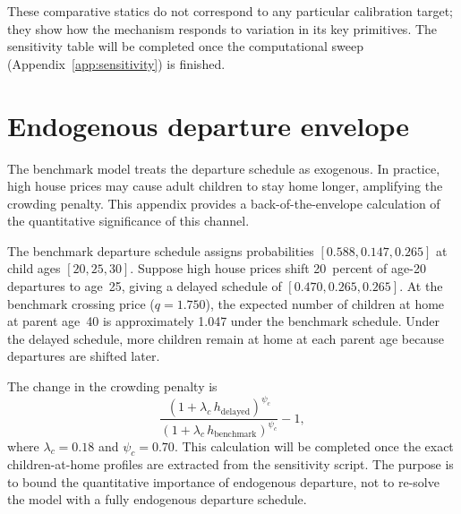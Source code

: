 \documentclass[11pt]{article}
\begin{document}
These comparative statics do not correspond to any particular calibration target; they show
how the mechanism responds to variation in its key primitives. The sensitivity table will be
completed once the computational sweep (Appendix~\ref{app:sensitivity}) is finished.

\section{Endogenous departure envelope}
\label{app:departure}

The benchmark model treats the departure schedule as exogenous. In practice, high house
prices may cause adult children to stay home longer, amplifying the crowding penalty. This
appendix provides a back-of-the-envelope calculation of the quantitative significance of
this channel.

The benchmark departure schedule assigns probabilities $[0.588, 0.147, 0.265]$ at child
ages $[20, 25, 30]$. Suppose high house prices shift 20~percent of age-20 departures to
age~25, giving a delayed schedule of $[0.470, 0.265, 0.265]$. At the benchmark crossing
price ($q = 1.750$), the expected number of children at home at parent age~40 is
approximately 1.047 under the benchmark schedule. Under the delayed schedule, more children
remain at home at each parent age because departures are shifted later.

The change in the crowding penalty is
\[
\frac{(1 + \lambda_c \, h_{\text{delayed}})^{\psi_c}}{(1 + \lambda_c \, h_{\text{benchmark}})^{\psi_c}} - 1,
\]
where $\lambda_c = 0.18$ and $\psi_c = 0.70$. This calculation will be completed once the
exact children-at-home profiles are extracted from the sensitivity script. The purpose is to
bound the quantitative importance of endogenous departure, not to re-solve the model with a
fully endogenous departure schedule.
\end{document}
